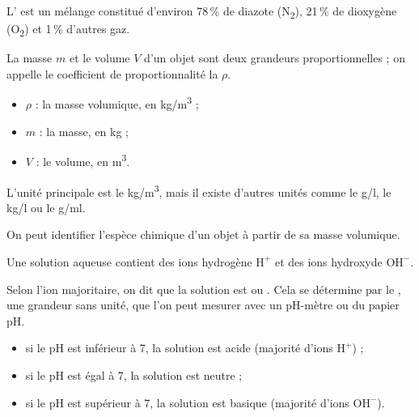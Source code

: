 \documentclass[11pt,a4paper]{article}
\begin{document}
L' est un mélange constitué d'environ 78\,\% de diazote (N\textsubscript{2}), 21\,\% de dioxygène (O\textsubscript{2}) et 1\,\% d'autres gaz.

\newpage

\vspace*{-0.5em}


La masse $m$ et le volume $V$ d'un objet sont deux grandeurs proportionnelles ;
on appelle le coefficient de proportionnalité la 
$\rho$.

\begin{center}
    \LARGE{}
\end{center}

\begin{itemize}
    \item $\rho$ : la masse volumique, en \si{\kilogram/\cubic\metre} ;
    \item $m$ : la masse, en \si{\kilogram} ;
    \item $V$ : le volume, en \si{\cubic\metre}.
\end{itemize}

\vspace*{-0.5em}

L'unité principale est le \si{\kilogram/\cubic\metre}, mais il existe d'autres
unités comme le \si{\gram/\litre}, le \si{\kilogram/\litre} ou le
\si{\gram/\milli\litre}.

On peut identifier l'espèce chimique d'un objet à partir de sa masse volumique.


\vspace*{-0.5em}


Une solution aqueuse contient des ions hydrogène $\mathrm{H^+}$ et des ions
hydroxyde $\mathrm{OH^-}$.

Selon l'ion majoritaire, on dit que la solution est  ou
. Cela se détermine par le , une grandeur sans
unité, que l'on peut mesurer avec un pH-mètre ou du papier pH.
\begin{itemize}
    \item si le pH est inférieur à 7, la solution est acide (majorité d'ions
    $\mathrm{H^+}$) ;
    \item si le pH est égal à 7, la solution est neutre ;
    \item si le pH est supérieur à 7, la solution est basique (majorité d'ions
    $\mathrm{OH^-}$).
\end{itemize}
\end{document}
